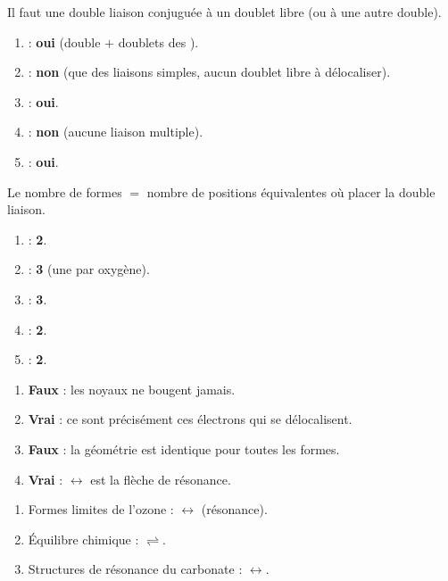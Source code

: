 \documentclass[11pt,a4paper]{article}
\begin{document}
\begin{corrige}[y a-t-il résonance ?]
Il faut une double liaison conjuguée à un doublet libre (ou à une autre double).
\begin{enumerate}[label=\alph*)]
  \item {} : \textbf{oui} (double  $+$ doublets des ).
  \item {} : \textbf{non} (que des liaisons simples, aucun doublet libre à délocaliser).
  \item {} : \textbf{oui}.
  \item {} : \textbf{non} (aucune liaison multiple).
  \item {} : \textbf{oui}.
\end{enumerate}
\end{corrige}

\begin{corrige}
Le nombre de formes $=$ nombre de positions équivalentes où placer la double liaison.
\begin{enumerate}[label=\alph*)]
  \item {} : \textbf{2}.
  \item {} : \textbf{3} (une par oxygène).
  \item {} : \textbf{3}.
  \item {} : \textbf{2}.
  \item {} : \textbf{2}.
\end{enumerate}
\end{corrige}

\begin{corrige}
\begin{enumerate}[label=\alph*)]
  \item \textbf{Faux} : les noyaux ne bougent jamais.
  \item \textbf{Vrai} : ce sont précisément ces électrons qui se délocalisent.
  \item \textbf{Faux} : la géométrie est identique pour toutes les formes.
  \item \textbf{Vrai} : $\leftrightarrow$ est la flèche de résonance.
\end{enumerate}
\end{corrige}

\begin{corrige}
\begin{enumerate}[label=\alph*)]
  \item Formes limites de l'ozone : $\boldsymbol{\leftrightarrow}$ (résonance).
  \item Équilibre chimique : $\boldsymbol{\rightleftharpoons}$.
  \item Structures de résonance du carbonate : $\boldsymbol{\leftrightarrow}$.
\end{enumerate}
\end{corrige}
\end{document}
